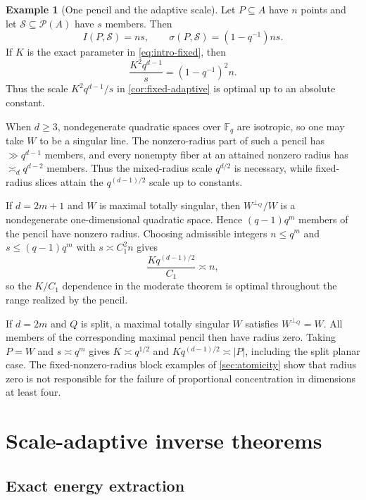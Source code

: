 \documentclass[11pt,letterpaper]{amsart}
\theoremstyle{definition}
\newtheorem{example}[example]{Example}
\theoremstyle{remark}
\newcommand{\1}{\mathbf 1}
\begin{document}
\begin{example}[One pencil and the adaptive scale]\label{ex:one-pencil}
Let $P\subseteq A$ have $n$ points and let $\mathcal S\subseteq\mathcal P(A)$ have $s$ members.  Then
\[
 I(P,\mathcal S)=ns,
 \qquad
 \sigma(P,\mathcal S)=(1-q^{-1})ns.
\]
If $K$ is the exact parameter in \eqref{eq:intro-fixed}, then
\begin{equation}\label{eq:pencil-sharp}
 \frac{K^2q^{d-1}}{s}=(1-q^{-1})^2n.
\end{equation}
Thus the scale $K^2q^{d-1}/s$ in \cref{cor:fixed-adaptive} is optimal up to an absolute constant.

When $d\ge3$, nondegenerate quadratic spaces over $\mathbb F_q$ are isotropic, so one may take $W$ to be a singular line.  The nonzero-radius part of such a pencil has $\gg q^{d-1}$ members, and every nonempty fiber at an attained nonzero radius has $\asymp_d q^{d-2}$ members.  Thus the mixed-radius scale $q^{d/2}$ is necessary, while fixed-radius slices attain the $q^{(d-1)/2}$ scale up to constants.

If $d=2m+1$ and $W$ is maximal totally singular, then $W^{\perp_Q}/W$ is a nondegenerate one-dimensional quadratic space.  Hence $(q-1)q^m$ members of the pencil have nonzero radius.  Choosing admissible integers $n\le q^m$ and $s\le(q-1)q^m$ with $s\asymp C_1^2n$ gives
\[
 \frac{Kq^{(d-1)/2}}{C_1}\asymp n,
\]
so the $K/C_1$ dependence in the moderate theorem is optimal throughout the range realized by the pencil.

If $d=2m$ and $Q$ is split, a maximal totally singular $W$ satisfies $W^{\perp_Q}=W$.  All members of the corresponding maximal pencil then have radius zero.  Taking $P=W$ and $s\asymp q^m$ gives $K\asymp q^{1/2}$ and $Kq^{(d-1)/2}\asymp|P|$, including the split planar case.  The fixed-nonzero-radius block examples of \cref{sec:atomicity} show that radius zero is not responsible for the failure of proportional concentration in dimensions at least four.
\end{example}

\section{Scale-adaptive inverse theorems}\label{sec:inverse}

\subsection{Exact energy extraction}
\end{document}
